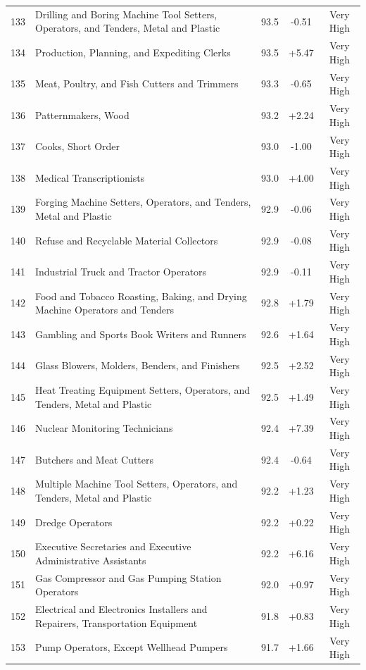 {\begin{longtable}{rp{7cm}ccc}
133 & Drilling and Boring Machine Tool Setters, Operators, and Tenders, Metal and Plastic & 93.5 & -0.51 & Very High \\
134 & Production, Planning, and Expediting Clerks & 93.5 & +5.47 & Very High \\
135 & Meat, Poultry, and Fish Cutters and Trimmers & 93.3 & -0.65 & Very High \\
136 & Patternmakers, Wood & 93.2 & +2.24 & Very High \\
137 & Cooks, Short Order & 93.0 & -1.00 & Very High \\
138 & Medical Transcriptionists & 93.0 & +4.00 & Very High \\
139 & Forging Machine Setters, Operators, and Tenders, Metal and Plastic & 92.9 & -0.06 & Very High \\
140 & Refuse and Recyclable Material Collectors & 92.9 & -0.08 & Very High \\
141 & Industrial Truck and Tractor Operators & 92.9 & -0.11 & Very High \\
142 & Food and Tobacco Roasting, Baking, and Drying Machine Operators and Tenders & 92.8 & +1.79 & Very High \\
143 & Gambling and Sports Book Writers and Runners & 92.6 & +1.64 & Very High \\
144 & Glass Blowers, Molders, Benders, and Finishers & 92.5 & +2.52 & Very High \\
145 & Heat Treating Equipment Setters, Operators, and Tenders, Metal and Plastic & 92.5 & +1.49 & Very High \\
146 & Nuclear Monitoring Technicians & 92.4 & +7.39 & Very High \\
147 & Butchers and Meat Cutters & 92.4 & -0.64 & Very High \\
148 & Multiple Machine Tool Setters, Operators, and Tenders, Metal and Plastic & 92.2 & +1.23 & Very High \\
149 & Dredge Operators & 92.2 & +0.22 & Very High \\
150 & Executive Secretaries and Executive Administrative Assistants & 92.2 & +6.16 & Very High \\
151 & Gas Compressor and Gas Pumping Station Operators & 92.0 & +0.97 & Very High \\
152 & Electrical and Electronics Installers and Repairers, Transportation Equipment & 91.8 & +0.83 & Very High \\
153 & Pump Operators, Except Wellhead Pumpers & 91.7 & +1.66 & Very High \\

\end{longtable}}
